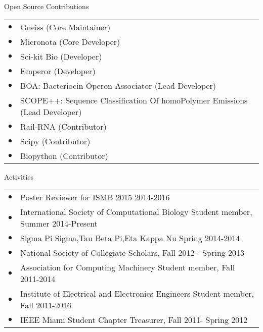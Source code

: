 \documentclass{resume} %
\begin{document}
\begin{rSection}{Open Source Contributions}
  \begin{tabular}{ll}
      $\bullet$ & Gneiss (Core Maintainer)\\
      $\bullet$ & Micronota (Core Developer)\\
      $\bullet$ & Sci-kit Bio (Developer)\\
      $\bullet$ & Emperor (Developer)\\
      $\bullet$ & BOA: Bacteriocin Operon Associator (Lead Developer)\\
      $\bullet$ & SCOPE++: Sequence Classification Of homoPolymer Emissions (Lead Developer)\\
      $\bullet$ & Rail-RNA (Contributor)\\
      $\bullet$ & Scipy (Contributor)\\
      $\bullet$ & Biopython (Contributor)\\
  \end{tabular}
\end{rSection}
\begin{rSection}{Activities}
  \begin{tabular}{ll}
    $\bullet$ & Poster Reviewer for ISMB 2015  2014-2016\\
    $\bullet$ & International Society of Computational Biology Student member, Summer  2014-Present\\
    $\bullet$ & Sigma Pi Sigma,Tau Beta Pi,Eta Kappa Nu Spring 2014-2014 \\
    $\bullet$ & National Society of Collegiate Scholars, Fall 2012 - Spring 2013\\
    $\bullet$ & Association for Computing Machinery Student member, Fall  2011-2014 \\
    $\bullet$ & Institute of Electrical and Electronics Engineers Student member, Fall  2011-2016 \\
    $\bullet$ & IEEE Miami Student Chapter Treasurer, Fall 2011- Spring 2012\\
  \end{tabular}
\end{rSection}

\end{document}
